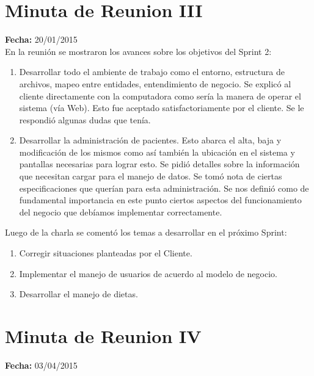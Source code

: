 \documentclass[runningheads,a4paper,spanish]{llncs}
\begin{document}
\section{Minuta de Reunion III}

\textbf{Fecha: }20/01/2015\\

En la reunión se mostraron los avances sobre los objetivos del Sprint 2:
\begin{enumerate}
\item Desarrollar todo el ambiente de trabajo como el entorno, estructura de archivos, mapeo entre entidades, entendimiento de negocio. Se explicó al cliente directamente con la computadora como sería la manera de operar el sistema (vía Web). Esto fue aceptado satisfactoriamente por el cliente. Se le respondió algunas dudas que tenía. 
\item Desarrollar la administración de pacientes. Esto abarca el alta, baja y modificación de los mismos como así también la ubicación en el sistema y pantallas necesarias para lograr esto. Se pidió detalles sobre la información que necesitan cargar para el manejo de datos. Se tomó nota de ciertas especificaciones que querían para esta administración. Se nos definió como de fundamental importancia en este punto ciertos aspectos del funcionamiento del negocio que debíamos implementar correctamente. 
\end{enumerate}

\begin{flushleft}
Luego de la charla se comentó los temas a desarrollar en el próximo Sprint:
\end{flushleft}

\begin{enumerate}
	\item Corregir situaciones planteadas por el Cliente. 
	\item Implementar el manejo de usuarios de acuerdo al modelo de negocio.
	\item Desarrollar el manejo de dietas. 
\end{enumerate}

\section{Minuta de Reunion IV}

\textbf{Fecha: }03/04/2015\\
\end{document}
